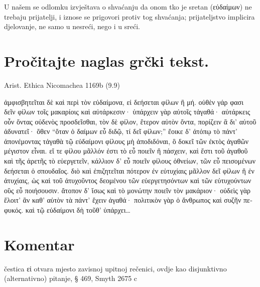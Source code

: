 U našem se odlomku izvještava o shvaćanju da onom tko je sretan \textgreek[variant=ancient]{(εὐδαίμων)} ne trebaju prijatelji, i iznose se prigovori protiv tog shvaćanja; prijateljstvo implicira djelovanje, ne samo u nesreći, nego i u sreći.


\section*{Pročitajte naglas grčki tekst.}

Arist. Ethica Nicomachea 1169b (9.9)


\medskip


{\large

\begin{greek}

\noindent  ἀμφισβητεῖται δὲ καὶ περὶ τὸν εὐδαίμονα, εἰ δεήσεται φίλων ἢ μή. οὐθὲν γάρ φασι δεῖν φίλων τοῖς μακαρίοις καὶ αὐτάρκεσιν· ὑπάρχειν γὰρ αὐτοῖς τἀγαθά· αὐτάρκεις οὖν ὄντας οὐδενὸς προσδεῖσθαι, τὸν δὲ φίλον, ἕτερον αὐτὸν ὄντα, πορίζειν ἃ δι' αὑτοῦ ἀδυνατεῖ· ὅθεν ``ὅταν ὁ δαίμων εὖ διδῷ, τί δεῖ φίλων;'' ἔοικε δ' ἀτόπῳ τὸ πάντ' ἀπονέμοντας τἀγαθὰ τῷ εὐδαίμονι φίλους μὴ ἀποδιδόναι, ὃ δοκεῖ τῶν ἐκτὸς ἀγαθῶν μέγιστον εἶναι. εἴ τε φίλου μᾶλλόν ἐστι τὸ εὖ ποιεῖν ἢ πάσχειν, καὶ ἔστι τοῦ ἀγαθοῦ καὶ τῆς ἀρετῆς τὸ εὐεργετεῖν, κάλλιον δ' εὖ ποιεῖν φίλους ὀθνείων, τῶν εὖ πεισομένων δεήσεται ὁ σπουδαῖος. διὸ καὶ ἐπιζητεῖται πότερον ἐν εὐτυχίαις μᾶλλον δεῖ φίλων ἢ ἐν ἀτυχίαις, ὡς καὶ τοῦ ἀτυχοῦντος δεομένου τῶν εὐεργετησόντων καὶ τῶν εὐτυχούντων οὓς εὖ ποιήσουσιν. ἄτοπον δ' ἴσως καὶ τὸ μονώτην ποιεῖν τὸν μακάριον· οὐδεὶς γὰρ ἕλοιτ' ἂν καθ' αὑτὸν τὰ πάντ' ἔχειν ἀγαθά· πολιτικὸν γὰρ ὁ ἄνθρωπος καὶ συζῆν πεφυκός. καὶ τῷ εὐδαίμονι δὴ τοῦθ' ὑπάρχει\dots

\end{greek}

}


\section*{Komentar}



\begin{description}[noitemsep]
\item[εἰ\dots\ ἢ μή] čestica εἰ otvara mjesto zavisnoj upitnoj rečenici, ovdje kao disjunktivno (alternativno) pitanje, § 469, Smyth 2675 c
\end{description}

